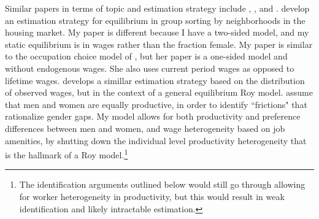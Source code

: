 \documentclass[11pt]{article}
\begin{document}
Similar papers in terms of topic and estimation strategy include , , and .  develop an estimation strategy for equilibrium in group sorting by neighborhoods in the housing market. My paper is different because I have a two-sided model, and my static equilibrium is in wages rather than the fraction female. My paper is similar to the occupation choice model of , but her paper is a one-sided model and without endogenous wages. She also uses current period wages as opposed to lifetime wages.  develops a simillar estimation strategy based on the distribution of observed wages, but in the context of a general equilibrium Roy model.  assume that men and women are equally productive, in order to identify ``frictions" that rationalize gender gaps. My model allows for both productivity and preference differences between men and women, and wage heterogeneity based on job amenities, by shutting down the individual level productivity heterogeneity that is the hallmark of a Roy model.\footnote{The identification arguments outlined below would still go through allowing for worker heterogeneity in productivity, but this would result in weak identification and likely intractable estimation.}


\end{document}
